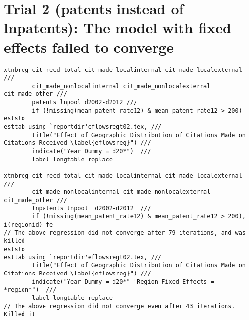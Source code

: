 \documentclass[12pt]{article}
\begin{document}
\section{Trial 2 (patents instead of lnpatents): The model with fixed effects failed to converge}
\begin{lstlisting}
xtnbreg cit_recd_total cit_made_localinternal cit_made_localexternal ///
		cit_made_nonlocalinternal cit_made_nonlocalexternal  cit_made_other ///
		patents lnpool d2002-d2012 ///
		if (!missing(mean_patent_rate12) & mean_patent_rate12 > 200)
eststo
esttab using `reportdir'eflowsregt02.tex, ///
		title("Effect of Geographic Distribution of Citations Made on Citations Received \label{eflowsreg}") ///
		indicate("Year Dummy = d20*")  ///
		label longtable replace
		
xtnbreg cit_recd_total cit_made_localinternal cit_made_localexternal /// 
		cit_made_nonlocalinternal cit_made_nonlocalexternal cit_made_other ///
		lnpatents lnpool  d2002-d2012  ///
		if (!missing(mean_patent_rate12) & mean_patent_rate12 > 200), i(regionid) fe
// The above regression did not converge after 79 iterations, and was killed	
eststo
esttab using `reportdir'eflowsregt02.tex, ///
		title("Effect of Geographic Distribution of Citations Made on Citations Received \label{eflowsreg}") ///
		indicate("Year Dummy = d20*" "Region Fixed Effects = *region*")  ///
		label longtable replace
// The above regression did not converge even after 43 iterations. Killed it
\end{lstlisting}

\end{document}
